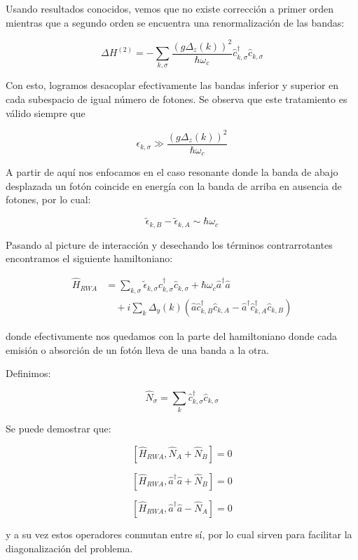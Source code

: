 \documentclass[11pt]{article}
\begin{document}
Usando resultados conocidos, vemos que no existe corrección a primer
orden mientras que a segundo orden se encuentra una renormalización
de las bandas:

\begin{equation}
\Delta H^{(2)}
=
-
\sum_{k,\sigma}
\frac{
\left(g\Delta_z(k)\right)^2
}{
\hbar\omega_c
}
\hat{c}_{k,\sigma}^\dagger
\hat{c}_{k,\sigma}
\end{equation}

Con esto, logramos desacoplar efectivamente las bandas inferior y
superior en cada subespacio de igual número de fotones. Se observa
que este tratamiento es válido siempre que

\begin{equation}
\epsilon_{k,\sigma}
\gg
\frac{
\left(g\Delta_z(k)\right)^2
}{
\hbar\omega_c
}
\end{equation}

A partir de aquí nos enfocamos en el caso resonante donde la banda
de abajo desplazada un fotón coincide en energía con la banda de
arriba en ausencia de fotones, por lo cual:

\begin{equation}
\tilde{\epsilon}_{k,B}
-
\tilde{\epsilon}_{k,A}
\sim
\hbar\omega_c
\end{equation}

Pasando al picture de interacción y desechando los términos
contrarrotantes encontramos el siguiente hamiltoniano:

\begin{align}
\hat{H}_{RWA}
&=
\sum_{k,\sigma}
\tilde{\epsilon}_{k,\sigma}
\hat{c}_{k,\sigma}^\dagger
\hat{c}_{k,\sigma}
+
\hbar\omega_c \hat{a}^\dagger \hat{a}
\nonumber
\\
&\quad
+
i\sum_k
\Delta_y(k)
\left(
\hat{a}
\hat{c}_{k,B}^\dagger
\hat{c}_{k,A}
-
\hat{a}^\dagger
\hat{c}_{k,A}^\dagger
\hat{c}_{k,B}
\right)
\end{align}

donde efectivamente nos quedamos con la parte del hamiltoniano donde
cada emisión o absorción de un fotón lleva de una banda a la otra.

Definimos:

\begin{equation}
\hat{N}_\sigma
=
\sum_k
\hat{c}_{k,\sigma}^\dagger
\hat{c}_{k,\sigma}
\end{equation}

Se puede demostrar que:

\begin{equation}
\left[
\hat{H}_{RWA},
\hat{N}_A + \hat{N}_B
\right]
=
0
\end{equation}

\begin{equation}
\left[
\hat{H}_{RWA},
\hat{a}^\dagger \hat{a} + \hat{N}_B
\right]
=
0
\end{equation}

\begin{equation}
\left[
\hat{H}_{RWA},
\hat{a}^\dagger \hat{a} - \hat{N}_A
\right]
=
0
\end{equation}

y a su vez estos operadores conmutan entre sí, por lo cual sirven
para facilitar la diagonalización del problema.
\end{document}
